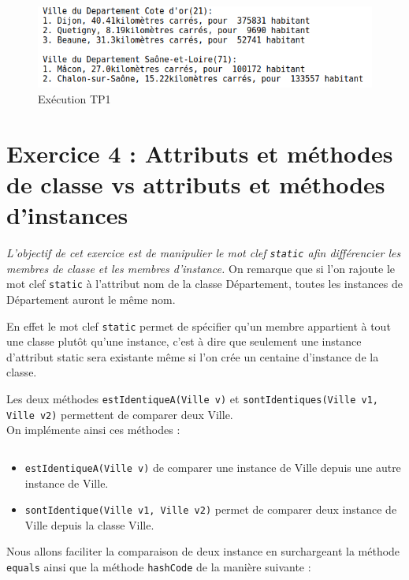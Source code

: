 \begin{figure}[H]
  \centering
  \includegraphics[width=400pt]{./tp/Pictures/tp1-execute}
  \caption{Exécution TP1}
  \label{Exécution TP1}
\end{figure}

\section{Exercice 4 : Attributs et méthodes de classe vs attributs et méthodes d'instances}
\textit{L'objectif de cet exercice est de manipulier le mot clef \texttt{static} afin différencier les membres de classe et les membres d'instance.}
On remarque que si l'on rajoute le mot clef \texttt{static} à l'attribut nom de la classe Département, toutes les instances de Département auront le même nom.

En effet le mot clef \texttt{static} permet de spécifier qu'un membre appartient à tout une classe plutôt qu'une instance, c'est à dire que seulement une instance d'attribut static sera existante même si l'on crée un centaine d'instance de la classe.

Les deux méthodes \texttt{estIdentiqueA(Ville v)} et \texttt{sontIdentiques(Ville v1, Ville v2)} permettent de comparer deux Ville.\\
On implémente ainsi ces méthodes :

\inputminted[linenos,firstline=59,lastline=70]{java}{../sources/src/tp1/Ville.java}

\begin{itemize}
  \item \texttt{estIdentiqueA(Ville v)} de comparer une instance de Ville depuis une autre instance de Ville.
  \item \texttt{sontIdentique(Ville v1, Ville v2)} permet de comparer deux instance de Ville depuis la classe Ville.
\end{itemize}

Nous allons faciliter la comparaison de deux instance en surchargeant la méthode \texttt{equals} ainsi que la méthode \texttt{hashCode} de la manière suivante :
\inputminted[linenos,firstline=72,lastline=89]{java}{../sources/src/tp1/Ville.java}
